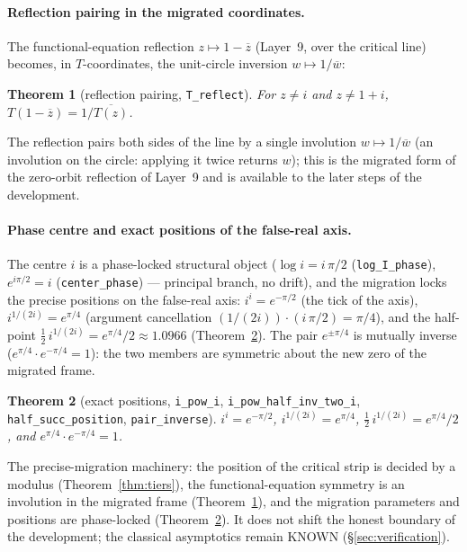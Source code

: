 \documentclass{article}
\newtheorem{theorem}{Theorem}[section]
\begin{document}
\paragraph{Reflection pairing in the migrated coordinates.}
The functional-equation reflection $z\mapsto 1-\overline z$ (Layer~9,
over the critical line) becomes, in $T$-coordinates, the unit-circle
inversion $w\mapsto 1/\overline w$:

\begin{theorem}[reflection pairing, \texttt{T\_reflect}]
\label{thm:reflect}
For $z\neq i$ and $z\neq1+i$,
$T(1-\overline z)=1/\overline{T(z)}$.
\end{theorem}

The reflection pairs both sides of the line by a single involution
$w\mapsto 1/\overline w$ (an involution on the circle: applying it twice
returns $w$); this is the migrated form of the zero-orbit reflection of
Layer~9 and is available to the later steps of the development.

\paragraph{Phase centre and exact positions of the false-real axis.}
The centre $i$ is a phase-locked structural object
($\log i=i\,\pi/2$ (\texttt{log\_I\_phase}), $e^{i\pi/2}=i$
(\texttt{center\_phase}) --- principal branch, no drift), and
the migration locks the precise positions on the false-real axis:
$i^i=e^{-\pi/2}$ (the tick of the axis), $i^{1/(2i)}=e^{\pi/4}$
(argument cancellation $(1/(2i))\cdot(i\,\pi/2)=\pi/4$), and the
half-point $\tfrac12\,i^{1/(2i)}=e^{\pi/4}/2\approx1.0966$
(Theorem~\ref{thm:exact}). The pair $e^{\pm\pi/4}$ is mutually inverse
($e^{\pi/4}\cdot e^{-\pi/4}=1$): the two members are symmetric about the
new zero of the migrated frame.

\begin{theorem}[exact positions, \texttt{i\_pow\_i}, \texttt{i\_pow\_half\_inv\_two\_i}, \texttt{half\_succ\_position}, \texttt{pair\_inverse}]
\label{thm:exact}
$i^i=e^{-\pi/2}$, $i^{1/(2i)}=e^{\pi/4}$,
$\tfrac12\,i^{1/(2i)}=e^{\pi/4}/2$, and
$e^{\pi/4}\cdot e^{-\pi/4}=1$.
\end{theorem}

The precise-migration machinery: the position of the
critical strip is decided by a modulus (Theorem~\ref{thm:tiers}), the
functional-equation symmetry is an involution in the migrated frame
(Theorem~\ref{thm:reflect}), and the migration parameters and positions are
phase-locked (Theorem~\ref{thm:exact}). It does not shift the honest
boundary of the development; the classical asymptotics remain KNOWN
(\S\ref{sec:verification}).
\end{document}

